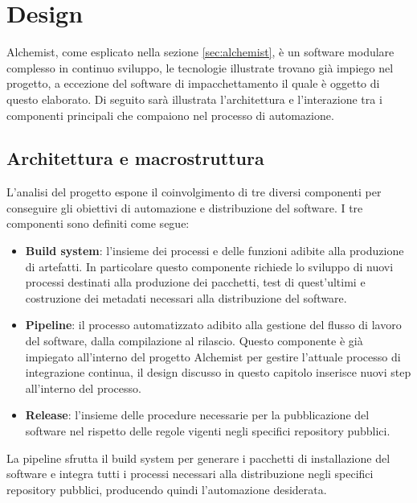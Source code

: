 
\chapter{Design}
Alchemist, come esplicato nella sezione \ref{sec:alchemist}, è un software modulare complesso in continuo sviluppo, le tecnologie illustrate trovano già impiego nel progetto, a eccezione del software di impacchettamento il quale è oggetto di questo elaborato. Di seguito sarà illustrata l'architettura e l'interazione tra i componenti principali che compaiono nel processo di automazione.

\section{Architettura e macrostruttura}
L'analisi del progetto espone il coinvolgimento di tre diversi componenti per conseguire gli obiettivi di automazione e distribuzione del software. I tre componenti sono definiti come segue: 
\begin{itemize}
	\item \textbf{Build system}: l'insieme dei processi e delle funzioni adibite alla produzione di artefatti. In particolare questo componente richiede lo sviluppo di nuovi processi destinati alla produzione dei pacchetti, test di quest'ultimi e costruzione dei metadati necessari alla distribuzione del software.
	\item \textbf{Pipeline}: il processo automatizzato adibito alla gestione del flusso di lavoro del software, dalla compilazione al rilascio. Questo componente è già impiegato all'interno del progetto Alchemist per gestire l'attuale processo di integrazione continua, il design discusso in questo capitolo inserisce nuovi step all'interno del processo.
	\item \textbf{Release}: l'insieme delle procedure necessarie per la pubblicazione del software nel rispetto delle regole vigenti negli specifici repository pubblici.
\end{itemize}
La pipeline sfrutta il build system per generare i pacchetti di installazione del software e integra tutti i processi necessari alla distribuzione negli specifici repository pubblici, producendo quindi l'automazione desiderata.

